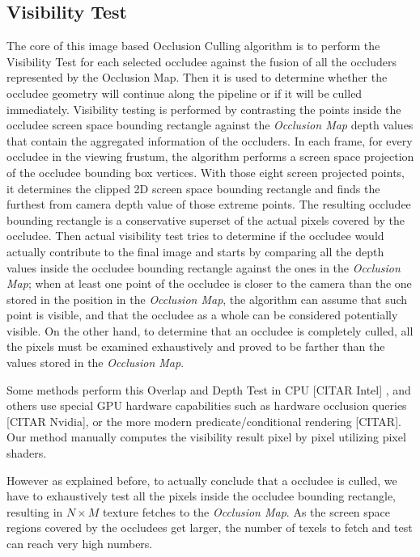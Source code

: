 \documentclass[10pt, conference]{IEEEtran}
\begin{document}
\subsection{Visibility Test}
%
The core of this image based Occlusion Culling algorithm is to perform the Visibility Test for each selected occludee against the fusion of all the occluders represented by the Occlusion Map. 
Then it is used to determine whether the occludee geometry will continue along the pipeline or if it will be culled immediately.
Visibility testing is performed by contrasting the points inside the occludee screen space bounding rectangle against the \emph{Occlusion Map} depth values that contain the aggregated information of the occluders.  
In each frame, for every occludee in the viewing frustum, the algorithm performs a screen space projection of the occludee bounding box vertices. 
With those eight screen projected points, it determines the clipped 2D screen space bounding rectangle and finds the furthest from camera depth value of those extreme points. 
The resulting occludee bounding rectangle is a conservative superset of the actual pixels covered by the occludee. 
Then actual visibility test tries to determine if the occludee would actually contribute to the final image and starts by comparing all 
the depth values inside the occludee bounding rectangle against the ones in the \emph{Occlusion Map}; when at least one point of the occludee 
is closer to the camera than the one stored in the position in the \emph{Occlusion Map}, the algorithm can assume that such point is visible, 
and that the occludee as a whole can be considered potentially visible. 
On the other hand, to determine that an occludee is completely culled, all the pixels must be examined exhaustively and proved to be farther than the values stored in the \emph{Occlusion Map}.\
 
Some methods perform this Overlap and Depth Test in CPU \cite{frostbite} [CITAR Intel] \cite{lazy_occlusion_grid} \cite{cacic_occlusion_2},  
and others use special GPU hardware capabilities such as hardware occlusion queries [CITAR Nvidia], \cite{occlusion_queries} or the more modern 
predicate/conditional rendering [CITAR]. 
Our method manually computes the visibility result pixel by pixel utilizing pixel shaders.\

However as explained before, to actually conclude that a occludee is culled, we have to exhaustively test all the pixels inside the occludee bounding 
rectangle, resulting in $N \times M$ texture fetches to the \emph{Occlusion Map}. 
As the screen space regions covered by the occludees get larger, the number of texels to fetch and test can reach very high numbers.\
\end{document}
